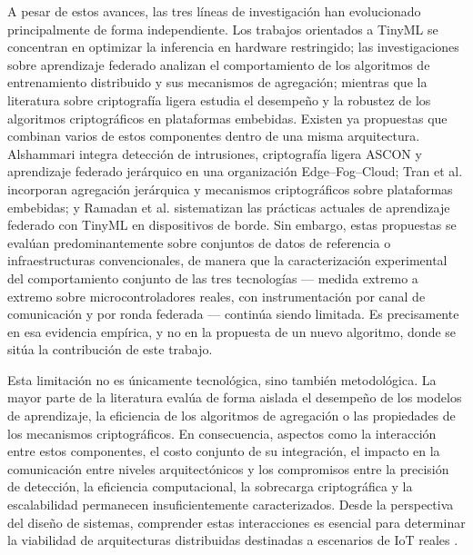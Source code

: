 \documentclass[journal,article,submit,moreauthors]{Definitions/mdpi}
\begin{document}
A pesar de estos avances, las tres líneas de investigación han evolucionado principalmente de forma independiente. Los trabajos orientados a TinyML se concentran en optimizar la inferencia en hardware restringido; las investigaciones sobre aprendizaje federado analizan el comportamiento de los algoritmos de entrenamiento distribuido y sus mecanismos de agregación; mientras que la literatura sobre criptografía ligera estudia el desempeño y la robustez de los algoritmos criptográficos en plataformas embebidas. Existen ya propuestas que combinan varios de estos componentes dentro de una misma arquitectura. Alshammari \cite{Alshammari2026} integra detección de intrusiones, criptografía ligera ASCON y aprendizaje federado jerárquico en una organización Edge--Fog--Cloud; Tran et al. \cite{Tran2026} incorporan agregación jerárquica y mecanismos criptográficos sobre plataformas embebidas; y Ramadan et al. \cite{Ramadan2025} sistematizan las prácticas actuales de aprendizaje federado con TinyML en dispositivos de borde. Sin embargo, estas propuestas se evalúan predominantemente sobre conjuntos de datos de referencia o infraestructuras convencionales, de manera que la caracterización experimental del comportamiento conjunto de las tres tecnologías --- medida extremo a extremo sobre microcontroladores reales, con instrumentación por canal de comunicación y por ronda federada --- continúa siendo limitada. Es precisamente en esa evidencia empírica, y no en la propuesta de un nuevo algoritmo, donde se sitúa la contribución de este trabajo.

Esta limitación no es únicamente tecnológica, sino también metodológica. La mayor parte de la literatura evalúa de forma aislada el desempeño de los modelos de aprendizaje, la eficiencia de los algoritmos de agregación o las propiedades de los mecanismos criptográficos. En consecuencia, aspectos como la interacción entre estos componentes, el costo conjunto de su integración, el impacto en la comunicación entre niveles arquitectónicos y los compromisos entre la precisión de detección, la eficiencia computacional, la sobrecarga criptográfica y la escalabilidad permanecen insuficientemente caracterizados. Desde la perspectiva del diseño de sistemas, comprender estas interacciones es esencial para determinar la viabilidad de arquitecturas distribuidas destinadas a escenarios de IoT reales \cite{Alshammari2026,Cooray2025}.
\end{document}
